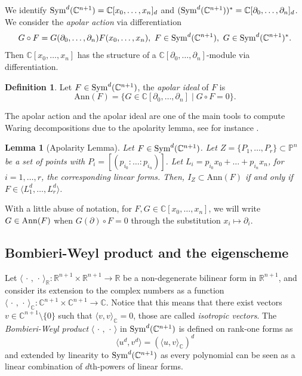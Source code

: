 \documentclass{amsart}
\numberwithin{theorem}{section}
\newtheorem{lemma}[theorem]{Lemma}
\theoremstyle{definition}
\newtheorem{definition}[theorem]{Definition}
\newcommand{\PP}{\mathbb{P}}
\newcommand{\CC}{\mathbb{C}}
\newcommand{\RR}{\mathbb{R}}
\newcommand{\sym}{\mathop{\rm Sym}\nolimits}
\begin{document}
We identify $\sym^d(\CC^{n+1})=\CC[x_0,\dots,x_n]_d$ and $(\sym^d(\CC^{n+1}))^\ast=\CC[\partial_0,\dots,\partial_n]_d$. We consider the \emph{apolar action} via differentiation
\[
    G\circ F=G(\partial_0,\dots,\partial_n) F(x_0,\dots,x_n),\ F\in \sym^d(\CC^{n+1}),\ G\in \sym^d(\CC^{n+1})^*.
\]
Then $\CC[x_0,\dots,x_n]$ 
has the structure of a $\CC[\partial_0,\dots,\partial_n]$-module 
via differentiation.
\begin{definition}
    Let $F\in \sym^d(\CC^{n+1})$, the \emph{apolar ideal} of $F$ is $$
    \mathrm{Ann}(F)=\{G \in \CC[\partial_0,\dots,\partial_n]\mid G \circ F=0\}.
    $$
\end{definition}
The apolar action and the apolar ideal are one of the main tools to compute Waring decompositions due to the apolarity lemma, see for instance \cite[Lemma 1.15]{IarrobinoKanev}.

\begin{lemma}[Apolarity Lemma]
     Let $F\in \sym^d(\CC^{n+1})$.  Let $Z=\{P_1,\dots, P_r\}\subset \PP^n$ be a set of points with $P_i=[(p_{i_0}:\dots:p_{i_n})]$. Let $L_i=p_{i_0}x_0+\dots+p_{i_n}x_n$, for $i=1,\dots,r$, the corresponding linear forms. Then, $I_Z\subset \mathrm{Ann}(F)$ if and only if $F\in \langle L_1^d,\dots,L_r^d\rangle$.
\end{lemma}

With a little abuse of notation, for $F,G\in\CC[x_0,\ldots,x_n]$, we will write $G \in {\rm Ann}(F)$ when $G(\partial)\circ F = 0$ through the substitution $x_i \mapsto \partial_i$. 

\subsection{Bombieri-Weyl product and the eigenscheme}
Let $\langle \, \cdot \, , \, \cdot \,  \rangle_\RR:\RR^{n+1}\times \RR^{n+1}\to \RR$ be a non-degenerate bilinear form in $\RR^{n+1}$, and consider its extension to the complex numbers as a function $\langle \, \cdot\, ,\, \cdot \,  \rangle_\CC:\CC^{n+1}\times\CC^{n+1}\to \CC$. Notice that this means that there exist vectors $v\in\CC^{n+1}\setminus \{ 0\}$ such that $\langle v,v\rangle_\CC=0$, those are called \emph{isotropic vectors}. The \emph{Bombieri-Weyl product} $\langle \, \cdot \,,\, \cdot \,\rangle $ in $\sym^d(\CC^{n+1})$ is defined on rank-one forms as
\[
    \langle u^d,v^d\rangle=(\langle u,v\rangle_\CC)^d
\]
and extended by linearity to $\sym^d(\CC^{n+1})$ as every polynomial can be seen as a linear combination of $d$th-powers of linear forms. 
\end{document}
